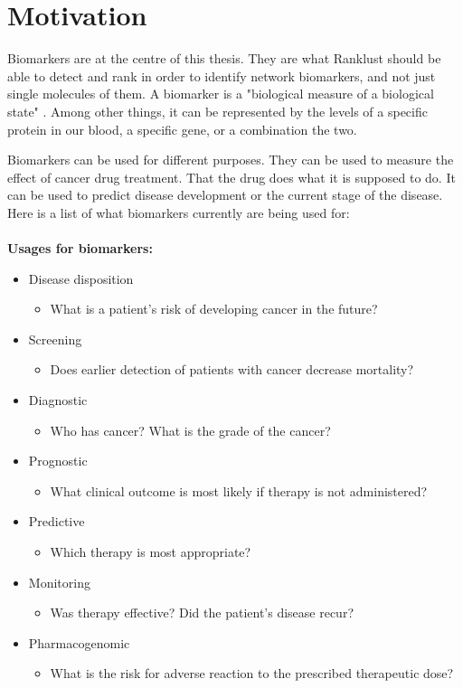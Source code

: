 \chapter{Motivation}
Biomarkers are at the centre of this thesis. They are what Ranklust should be
able to detect and rank in order to identify network biomarkers, and not just
single molecules of them. A biomarker is a "biological measure of a biological
state" \cite{biomarker1}. Among other things, it can be represented by the
levels of a specific protein in our blood, a specific gene, or a combination the
two.

Biomarkers can be used for different purposes. They can be used to measure the
effect of cancer drug treatment. That the drug does what it is supposed to do.
It can be used to predict disease development or the current stage of the
disease.  Here is a list of what biomarkers currently are being used for:
\\\\
\textbf{Usages for biomarkers:} \cite{beyondpsa}
\begin{itemize}
    \item Disease disposition
        \begin{itemize}
            \item What is a patient's risk of developing cancer in the future?
        \end{itemize}
    \item Screening
        \begin{itemize}
            \item Does earlier detection of patients with cancer decrease
                mortality?
        \end{itemize}
    \item Diagnostic
        \begin{itemize}
            \item Who has cancer? What is the grade of the cancer?
        \end{itemize}
    \item Prognostic
        \begin{itemize}
            \item What clinical outcome is most likely if therapy is not
                administered?
        \end{itemize}
    \item Predictive
        \begin{itemize}
            \item Which therapy is most appropriate?
        \end{itemize}
    \item Monitoring
        \begin{itemize}
            \item Was therapy effective? Did the patient's disease recur?
        \end{itemize}
    \item Pharmacogenomic
        \begin{itemize}
            \item What is the risk for adverse reaction to the prescribed
                therapeutic dose?
        \end{itemize}
\end{itemize}
